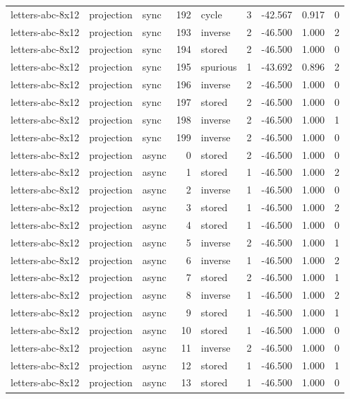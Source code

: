 \begin{tabular}{lllrlrrrr}
letters-abc-8x12 & projection & sync & 192 & cycle & 3 & -42.567 & 0.917 & 0 \\
letters-abc-8x12 & projection & sync & 193 & inverse & 2 & -46.500 & 1.000 & 2 \\
letters-abc-8x12 & projection & sync & 194 & stored & 2 & -46.500 & 1.000 & 0 \\
letters-abc-8x12 & projection & sync & 195 & spurious & 1 & -43.692 & 0.896 & 2 \\
letters-abc-8x12 & projection & sync & 196 & inverse & 2 & -46.500 & 1.000 & 0 \\
letters-abc-8x12 & projection & sync & 197 & stored & 2 & -46.500 & 1.000 & 0 \\
letters-abc-8x12 & projection & sync & 198 & inverse & 2 & -46.500 & 1.000 & 1 \\
letters-abc-8x12 & projection & sync & 199 & inverse & 2 & -46.500 & 1.000 & 0 \\
letters-abc-8x12 & projection & async & 0 & stored & 2 & -46.500 & 1.000 & 0 \\
letters-abc-8x12 & projection & async & 1 & stored & 1 & -46.500 & 1.000 & 2 \\
letters-abc-8x12 & projection & async & 2 & inverse & 1 & -46.500 & 1.000 & 0 \\
letters-abc-8x12 & projection & async & 3 & stored & 1 & -46.500 & 1.000 & 2 \\
letters-abc-8x12 & projection & async & 4 & stored & 1 & -46.500 & 1.000 & 0 \\
letters-abc-8x12 & projection & async & 5 & inverse & 2 & -46.500 & 1.000 & 1 \\
letters-abc-8x12 & projection & async & 6 & inverse & 1 & -46.500 & 1.000 & 2 \\
letters-abc-8x12 & projection & async & 7 & stored & 2 & -46.500 & 1.000 & 1 \\
letters-abc-8x12 & projection & async & 8 & inverse & 1 & -46.500 & 1.000 & 2 \\
letters-abc-8x12 & projection & async & 9 & stored & 1 & -46.500 & 1.000 & 1 \\
letters-abc-8x12 & projection & async & 10 & stored & 1 & -46.500 & 1.000 & 0 \\
letters-abc-8x12 & projection & async & 11 & inverse & 2 & -46.500 & 1.000 & 0 \\
letters-abc-8x12 & projection & async & 12 & stored & 1 & -46.500 & 1.000 & 1 \\
letters-abc-8x12 & projection & async & 13 & stored & 1 & -46.500 & 1.000 & 0 \\

\end{tabular}
